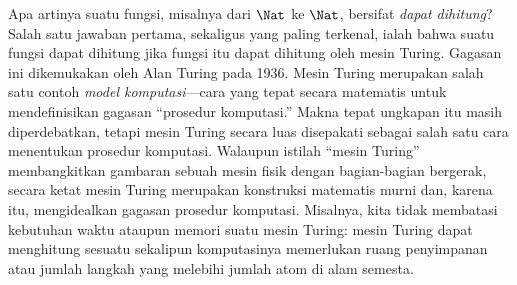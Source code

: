 \documentclass[../../../include/open-logic-section]{subfiles}
\begin{document}

Apa artinya suatu fungsi, misalnya dari $\Nat$ ke $\Nat$, bersifat
\emph{dapat dihitung}? Salah satu jawaban pertama, sekaligus yang paling
terkenal, ialah bahwa suatu fungsi dapat dihitung jika fungsi itu dapat
dihitung oleh mesin Turing. Gagasan ini dikemukakan oleh Alan Turing pada
1936. Mesin Turing merupakan salah satu contoh \emph{model komputasi}---cara
yang tepat secara matematis untuk mendefinisikan gagasan ``prosedur
komputasi.'' Makna tepat ungkapan itu masih diperdebatkan, tetapi mesin Turing
secara luas disepakati sebagai salah satu cara menentukan prosedur komputasi.
Walaupun istilah ``mesin Turing'' membangkitkan gambaran sebuah mesin fisik
dengan bagian-bagian bergerak, secara ketat mesin Turing merupakan konstruksi
matematis murni dan, karena itu, mengidealkan gagasan prosedur komputasi.
Misalnya, kita tidak membatasi kebutuhan waktu ataupun memori suatu mesin
Turing: mesin Turing dapat menghitung sesuatu sekalipun komputasinya memerlukan
ruang penyimpanan atau jumlah langkah yang melebihi jumlah atom di alam
semesta.
\end{document}
